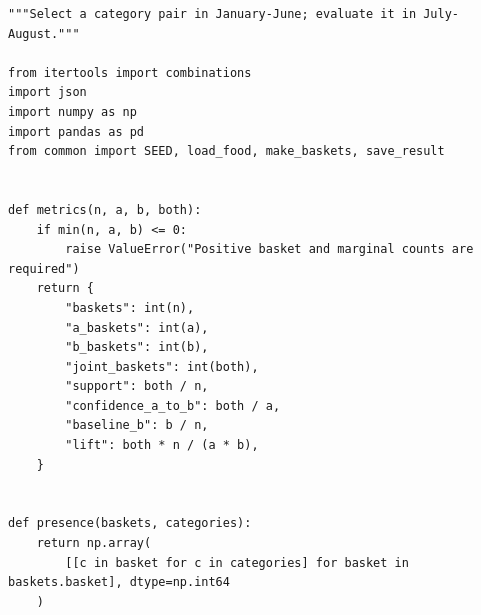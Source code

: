 \begin{Verbatim}[breaklines,breakanywhere,fontsize=\small]
"""Select a category pair in January-June; evaluate it in July-August."""

from itertools import combinations
import json
import numpy as np
import pandas as pd
from common import SEED, load_food, make_baskets, save_result


def metrics(n, a, b, both):
    if min(n, a, b) <= 0:
        raise ValueError("Positive basket and marginal counts are required")
    return {
        "baskets": int(n),
        "a_baskets": int(a),
        "b_baskets": int(b),
        "joint_baskets": int(both),
        "support": both / n,
        "confidence_a_to_b": both / a,
        "baseline_b": b / n,
        "lift": both * n / (a * b),
    }


def presence(baskets, categories):
    return np.array(
        [[c in basket for c in categories] for basket in baskets.basket], dtype=np.int64
    )



\end{Verbatim}
